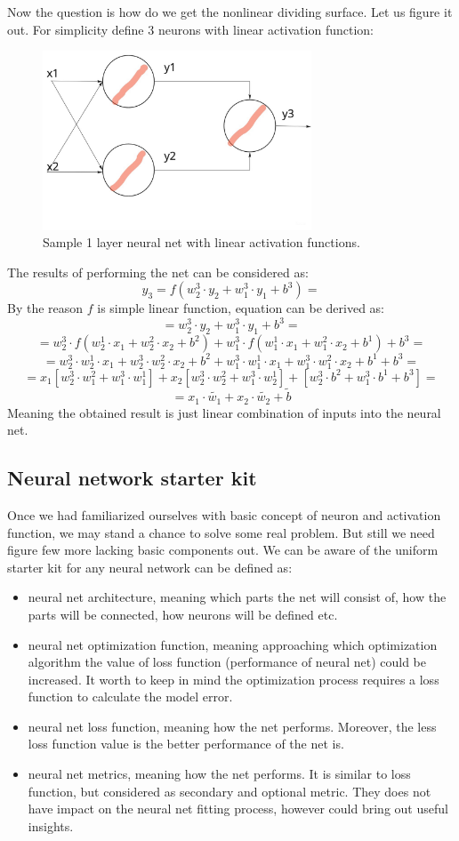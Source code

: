 Now the question is how do we get the nonlinear dividing surface. Let us figure it out.
For simplicity define 3 neurons with linear activation function:
\begin{figure}[h]
    \centering \includegraphics[width=8cm]{images/3_neurons_net.jpg}
    \caption {Sample 1 layer neural net with linear activation functions.}
\end{figure}
The results of performing the net can be considered as:
\[ y_3 = f(w_2^3 \cdot y_2+w_1^3 \cdot y_1+b^3) = \]
By the reason $f$ is simple linear function, equation can be derived as:
\[ = w_2^3 \cdot y_2+w_1^3 \cdot y_1+b^3 = \] 
\[ = w_2^3 \cdot f(w_2^1\cdot x_1+w_2^2 \cdot x_2+b^2) + w_1^3 \cdot f(w_1^1 \cdot x_1+w_1^2 \cdot x_2+b^1) + b^3 = \]   
\[ = w_2^3 \cdot w_2^1 \cdot x_1+w_2^3 \cdot w_2^2 \cdot x_2+b^2 + w_1^3 \cdot w_1^1 \cdot x_1+w_1^3 \cdot w_1^2 \cdot x_2+b^1+b^3 = \]
\[ = x_1[w_2^3 \cdot w_1^2 + w_1^3 \cdot w_1^1] + x_2[w_2^3 \cdot w_2^2 + w_1^3 \cdot w_2^1] + [w_2^3 \cdot b^2+w_1^3 \cdot b^1+b^3] = \]
\[ =  x_1\cdot \tilde{w_1} + x_2\cdot \tilde{w_2} + \tilde{b} \]
Meaning the obtained result is just linear combination of inputs into the neural net. 

\subsection{Neural network starter kit}
Once we had familiarized ourselves with basic concept of neuron and activation function, we may stand a chance to solve some real problem. But still we need figure few more lacking basic components out.
We can be aware of the uniform starter kit for any neural network can be defined as:
\begin{itemize}
    \item neural net architecture, meaning which parts the net will consist of, how the parts will be connected, how neurons will be defined etc.
    \item neural net optimization function, meaning approaching which optimization algorithm the value of loss function (performance of neural net) could be increased. It worth to keep in mind the optimization process requires a loss function to calculate the model error.
    \item neural net loss function, meaning how the net performs. Moreover, the less loss function value is the better performance of the net is.
    \item neural net metrics, meaning how the net performs. It is similar to loss function, but considered as secondary and optional metric. They does not have impact on the neural net fitting process, however could bring out useful insights.    
\end{itemize}


